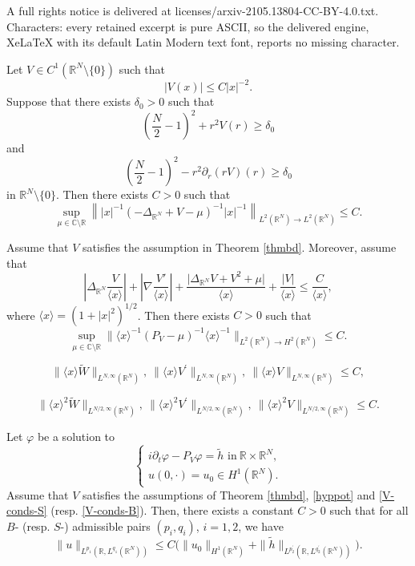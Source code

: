 \documentclass[10pt,a4paper]{amsart}
\newcommand{\R}{\mathbb{R}}
\begin{document}
A full rights notice is delivered at licenses/arxiv-2105.13804-CC-BY-4.0.txt. Characters: every retained excerpt is pure ASCII, so the delivered engine, XeLaTeX with its default Latin Modern text font, reports no missing character.
\begin{thm} \label{thmbd}
Let $V\in C^1 (\R^N \setminus \{0\})$ such that
$$|V(x)|\leq C |x|^{-2}.$$
Suppose that there exists $\delta_0>0$ such that
\[
\left(\frac{N}{2} -1\right)^2 +r^2 V(r) \geq \delta_0
\]
and
\[
\left(\frac{N}{2} -1\right)^2 - r^2 \partial_r (rV)(r) \geq \delta_0
\]
in $\R^N \setminus \{0\}$.
Then there exists $C>0$ such that
$$\sup_{\mu \in \mathbb{C} \setminus \R } \left\| |x|^{-1} (-\Delta_{\R^N} +V -\mu)^{-1} |x|^{-1}\right\|_{L^2 (\R^N) \rightarrow L^2 (\R^N)}\leq C.$$
\end{thm}

\begin{prop}
Assume that $V$ satisfies the assumption in Theorem \ref{thmbd}. Moreover, assume that
\begin{equation}
\label{hyppot}
\left|\Delta_{\R^N} \frac{V}{\langle x\rangle}\right| +\left|\nabla\frac{V'}{\langle x\rangle}\right|+\dfrac{ \big| \Delta_{\R^N} V +V^2 +\mu \big|}{\langle x \rangle} + \frac{|V|}{\langle x\rangle} \leq \frac{C}{\langle x \rangle},
\end{equation}
where $\langle x\rangle =(1+|x|^2)^{1/2}$.
Then there exists $C>0$ such that
$$\sup_{\mu \in \mathbb{C} \setminus \R} \big\| \langle x\rangle^{-1}  (P_V -\mu)^{-1} \langle x\rangle ^{-1} \big\|_{L^2 (\R^N) \rightarrow H^2 (\R^N)}\leq C. $$
\end{prop}

\begin{equation}\label{V-conds-S}
\|\langle x\rangle \tilde{W}\|_{L^{N,\infty}(\R^N)},\  \|\langle x\rangle V^\prime\|_{L^{N,\infty}(\R^N)},\ \|\langle x\rangle V\|_{L^{N,\infty}(\R^N)}\leq C,
\end{equation}

\begin{equation}\label{V-conds-B}
\|\langle x\rangle^2 \tilde{W}\|_{L^{N/2,\infty}(\R^N)},\  \|\langle x\rangle^2 V^\prime\|_{L^{N/2,\infty}(\R^N)},\ \|\langle x\rangle^2 V\|_{L^{N/2,\infty}(\R^N)}\leq C.
\end{equation}

\begin{thm}
Let $\varphi$ be a solution to
$$\begin{cases}
i\partial_t \varphi- P_V  \varphi =\tilde{h}\mbox{ in}\ \R \times \R^N ,\\
u(0,\cdot)=u_0 \in H^1 (\R^N).
\end{cases}$$
Assume that $V$ satisfies the assumptions of Theorem \ref{thmbd}, \eqref{hyppot} and \eqref{V-conds-S} (resp. \eqref{V-conds-B}). Then, there exists a constant $C>0$ such that for all $B$- (resp. $S$-) admissible pairs $(p_i,q_i)$, $i=1,2$,
 we have
$$\|u\|_{L^{p_1}(\R,L^{q_1} (\R^N))} \leq C \big(\|u_0\|_{H^1 (\R^N)} +\|\tilde{h}\|_{L^{p_2^\prime} (\R , L^{q_2^\prime} (\R^N))}\big).$$
\end{thm}
\end{document}

